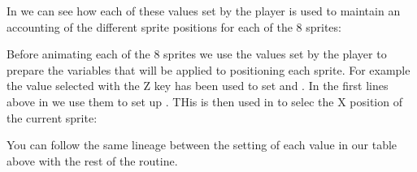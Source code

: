 In  we can see how each of these values
set by the player is used to maintain an accounting of the different sprite positions for each of the 8 sprites:

%


Before animating each of the 8 sprites we use the values set by the player to prepare the variables
that will be applied to positioning each sprite. For example the value selected with the Z key has been
used to set  and . In the first lines above
in  we use them to set up . THis is then used
in  to selec the X position of the current sprite:


%


You can follow the same lineage between the setting of each value in our table above with the rest of the
 routine.


